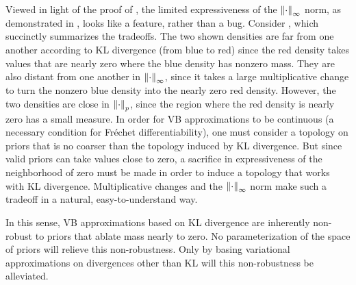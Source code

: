 Viewed in light of the proof of , the limited
expressiveness of the $\left\Vert\cdot\right\Vert_{\infty}$ norm, as demonstrated in
, looks like a feature, rather than a bug.
Consider , which succinctly summarizes the tradeoffs.  The two
shown densities are far from one another according to KL divergence (from blue
to red) since the red density takes values that are nearly zero where the blue
density has nonzero mass. They are also distant from one another in
$\left\Vert\cdot\right\Vert_{\infty}$, since it takes a large multiplicative change to turn the
nonzero blue density into the nearly zero red density. However, the two
densities are close in $\left\Vert\cdot\right\Vert_{p}$, since the region where the red
density is nearly zero has a small measure. In order for VB approximations to be
continuous (a necessary condition for Fr{\'e}chet differentiability), one must
consider a topology on priors that is no coarser than the topology induced by KL
divergence.  But since valid priors can take values close to zero, a sacrifice
in expressiveness of the neighborhood of zero must be made in order to induce a
topology that works with KL divergence. Multiplicative changes and the
$\left\Vert\cdot\right\Vert_{\infty}$ norm make such a tradeoff in a natural, easy-to-understand
way.

In this sense, VB approximations based on KL divergence are inherently
non-robust to priors that ablate mass nearly to zero.  No parameterization of
the space of priors will relieve this non-robustness.  Only by basing
variational approximations on divergences other than KL will this non-robustness
be alleviated.

\FunctionDistFig{}

